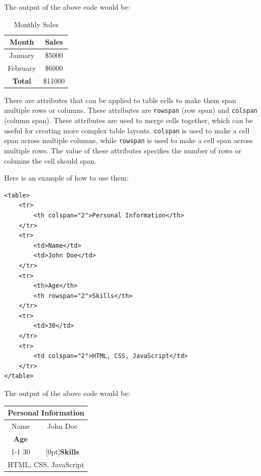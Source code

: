 The output of the above code would be:

\begin{table}[h]
\centering
\caption{Monthly Sales}
\begin{tabular}{|c|c|}
\hline
\textbf{Month} & \textbf{Sales} \\
\hline
January & \$5000 \\
February & \$6000 \\
\hline
\textbf{Total} & \$11000 \\
\hline
\end{tabular}
\end{table}

There are attributes that can be applied to table cells to make them span multiple rows or columns. These attributes are \verb|rowspan| (row span) and \verb|colspan| (column span).
These attributes are used to merge cells together, which can be useful for creating more complex table layouts.
\verb|colspan| is used to make a cell span across multiple columns, while \verb|rowspan| is used to make a cell span across multiple rows.
The value of these attributes specifies the number of rows or columns the cell should span.

Here is an example of how to use them:

\begin{verbatim}
<table>
    <tr>
        <th colspan="2">Personal Information</th>
    </tr>
    <tr>
        <td>Name</td>
        <td>John Doe</td>
    </tr>
    <tr>
        <th>Age</th>
        <th rowspan="2">Skills</th>
    </tr>
    <tr>
        <td>30</td>
    </tr>
    <tr>
        <td colspan="2">HTML, CSS, JavaScript</td>
    </tr>
</table>
\end{verbatim}

The output of the above code would be:

\begin{table}[h]
\centering
\begin{tabular}{|c|c|}
\hline
\multicolumn{2}{|c|}{\textbf{Personal Information}} \\
\hline
Name & John Doe \\
\hline
\textbf{Age} & \\
\cline{1-1}
30 & \raisebox{1.5ex}[0pt]{\textbf{Skills}} \\
\hline
\multicolumn{2}{|c|}{HTML, CSS, JavaScript} \\
\hline
\end{tabular}
\end{table}

